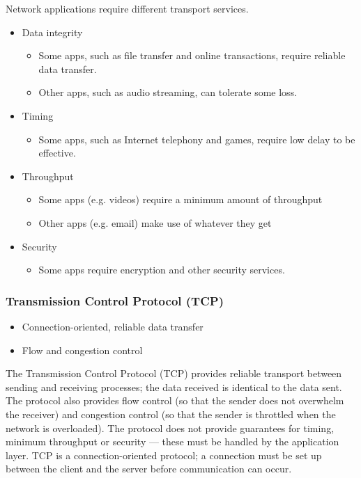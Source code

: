 Network applications require different transport services.
\begin{itemize}
  \item Data integrity
  \begin{itemize}
    \item Some apps, such as file transfer and online transactions, require reliable data transfer.
    \item Other apps, such as audio streaming, can tolerate some loss.
  \end{itemize}
  \item Timing
  \begin{itemize}
    \item Some apps, such as Internet telephony and games, require low delay to be effective.
  \end{itemize}
  \item Throughput
  \begin{itemize}
    \item Some apps (e.g. videos) require a minimum amount of throughput
    \item Other apps (e.g. email) make use of whatever they get
  \end{itemize}
  \item Security
  \begin{itemize}
    \item Some apps require encryption and other security services.
  \end{itemize}
\end{itemize}


\subsubsection{Transmission Control Protocol (TCP)}

\begin{itemize}
  \item Connection-oriented, reliable data transfer
  \item Flow and congestion control
\end{itemize}
The Transmission Control Protocol (TCP) provides reliable transport between sending and receiving processes; the data received is identical to the data sent.
The protocol also provides flow control (so that the sender does not overwhelm the receiver) and congestion control (so that the sender is throttled when the network is overloaded).
The protocol does not provide guarantees for timing, minimum throughput or security --- these must be handled by the application layer.
TCP is a connection-oriented protocol; a connection must be set up between the client and the server before communication can occur.

